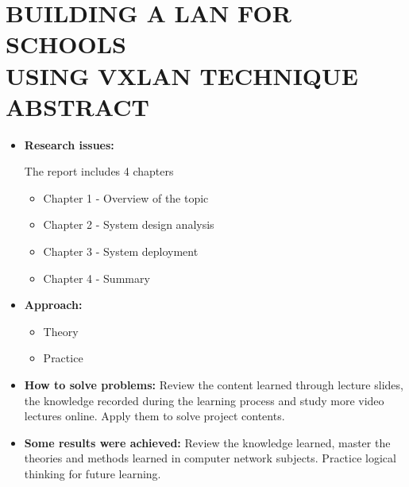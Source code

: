 \section*{\fontsize{16pt}{15pt}\selectfont BUILDING A LAN FOR SCHOOLS \\USING VXLAN TECHNIQUE \\ABSTRACT}

\begin{itemize}
    \item[-] \textbf{Research issues:}
    
    The report includes 4 chapters
        \begin{itemize}
        \item[•] Chapter 1 - Overview of the topic
        \item[•] Chapter 2 - System design analysis
        \item[•] Chapter 3 - System deployment
        \item[•] Chapter 4 - Summary
        \end{itemize}
    \item[-] \textbf{Approach:}
        \begin{itemize}
        \item[•] Theory
        \item[•] Practice
    \end{itemize}
    \item[-] \textbf{How to solve problems:}
    Review the content learned through lecture slides, the knowledge recorded during the learning process and study more video lectures online. Apply them to solve project contents.
    \item[-] \textbf{Some results were achieved:}
    Review the knowledge learned, master the theories and methods learned in computer network subjects. Practice logical thinking for future learning.
\end{itemize}

\newpage